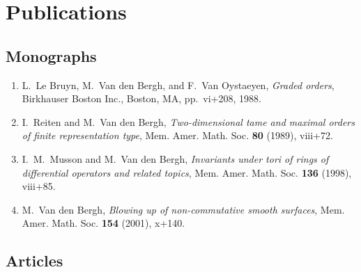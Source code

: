
\section*{Publications}
\subsection*{Monographs}

\begin{enumerate}

\item
L.~Le Bruyn, M.~Van den Bergh, and F.~Van Oystaeyen, {\em Graded orders}, Birkhauser Boston Inc., Boston, MA, pp.~vi+208, 1988.

\item
I.~Reiten and M.~Van den Bergh, {\em Two-dimensional tame and maximal orders of finite representation type}, Mem. Amer. Math. Soc. {\bf 80} (1989), viii+72.

\item
I.~M.~Musson and M.~Van den Bergh, {\em Invariants under tori of rings of differential operators and related topics}, Mem. Amer. Math. Soc. {\bf 136} (1998), viii+85.

\item
M.~Van den Bergh, {\em Blowing up of non-commutative smooth surfaces}, Mem. Amer. Math. Soc. {\bf 154} (2001), x+140.

\end{enumerate}


\subsection*{Articles}

